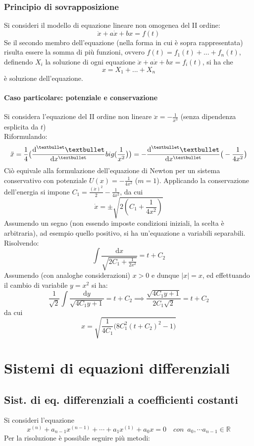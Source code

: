 \documentclass[10pt]{article}
\theoremstyle{plain}
\begin{document}
\subsubsection{Principio di sovrapposizione}
Si consideri il modello di equazione lineare non omogenea del II ordine:
\[\ddot x + a \dot x + b x = f(t)\]
Se il secondo membro dell'equazione (nella forma in cui è sopra rappresentata) risulta essere la somma di più funzioni, ovvero $f(t) = f_1(t) + ... + f_n(t)$, definendo $X_i$ la soluzione di ogni equazione $\ddot x + a \dot x + b x = f_i(t)$, si ha che
\[x = X_1 + ... + X_n\]
è soluzione dell'equazione. 

\paragraph{Caso particolare: potenziale e conservazione}
Si considera l'equazione del II ordine non lineare $\displaystyle \ddot x = - \frac{1}{x^3}$ (senza dipendenza esplicita da $t$)
\\Riformulando:
\[\ddot x = \frac{1}{4}\big(\frac{\textrm{d}^{•} •}{\textrm{d}x^{•}}\\big(\frac{1}{x^2}\big)\big)= -\frac{\textrm{d}^{•} •}{\textrm{d}x^{•}}\big(-\frac{1}{4x^2}\big)\]
Ciò equivale alla formulazione dell'equazione di Newton per un sistema conservativo con potenziale $\displaystyle U(x) = - \frac{1}{4x^2}$ ($m=1$). Applicando la conservazione dell'energia si impone $\displaystyle C_1 = \frac{(\dot x)^2}{2} - \frac{1}{4x^2}$, da cui
\[\dot x = \pm \sqrt{2(C_1 + \frac{1}{4x^2})}\]
Assumendo un segno (non essendo imposte condizioni iniziali, la scelta è arbitraria), ad esempio quello positivo, si ha un'equazione a variabili separabili. Risolvendo:
\[\int \frac{\textrm{d}x}{\sqrt{2C_1 + \frac{1}{2x^2}}} = t + C_2\]
Assumendo (con analoghe considerazioni) $x>0$ e dunque $|x| = x$, ed effettuando il cambio di variabile $y = x^2$ si ha:
\[\frac{1}{\sqrt{2}}\int \frac{\textrm{d}y}{\sqrt{4C_1y + 1}} = t + C_2 \implies \frac{\sqrt{4C_1 y + 1}}{2C_1 \sqrt{2}} = t + C_2\]
da cui 
\[x = \sqrt{\frac{1}{4C_1} \big(8C_1^2 (t + C_2)^2 - 1\big)}\]

\section{Sistemi di equazioni differenziali}
\subsection{Sist. di eq. differenziali a coefficienti costanti}
Si consideri l'equazione
\[x^{(n)} + a_{n-1}x^{(n-1)} + \cdots + a_1x^{(1)} + a_0 x = 0 \quad con \enspace a_0, \cdots a_{n-1} \in \mathbb{R}\]
Per la risoluzione è possibile seguire più metodi:
\end{document}
